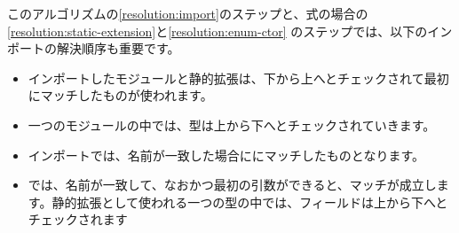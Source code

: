 このアルゴリズムの\ref{resolution:import}のステップと、式の場合の\ref{resolution:static-extension}と\ref{resolution:enum-ctor}
のステップでは、以下のインポートの解決順序も重要です。

\begin{itemize}
	\item インポートしたモジュールと静的拡張は、下から上へとチェックされて最初にマッチしたものが使われます。
	\item 一つのモジュールの中では、型は上から下へとチェックされていきます。
	\item インポートでは、名前が一致した場合ににマッチしたものとなります。
	\item {}では、名前が一致して、なおかつ最初の引数ができると、マッチが成立します。静的拡張として使われる一つの型の中では、フィールドは上から下へとチェックされます
\end{itemize}
